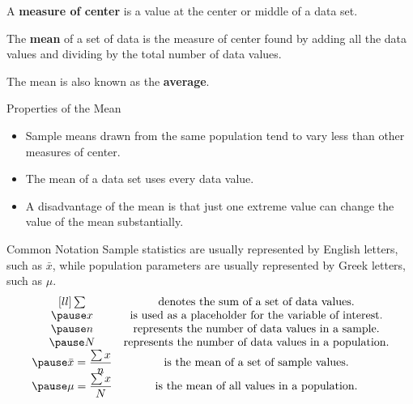 \documentclass{beamer}
\begin{document}
\begin{frame}
\begin{definition}
A \textbf{measure of center} is a value at the center or middle of a data set.
\end{definition}\pause

\begin{definition}
The \textbf{mean} of a set of data is the measure of center found by adding all the data values and dividing by the total number of data values.
\end{definition}\pause

\begin{note}
The mean is also known as the \textbf{average}.
\end{note}\pause

\begin{block}{Properties of the Mean}
\begin{itemize}
\item Sample means drawn from the same population tend to vary less than other measures of center.\pause
\item The mean of a data set uses every data value.\pause
\item A disadvantage of the mean is that just one extreme value can change the value of the mean substantially.
\end{itemize}
\end{block}
\end{frame}

\begin{frame}
\begin{block}{Common Notation}
Sample statistics are usually represented by English letters, such as $\bar{x}$, while population parameters are usually represented by Greek letters, such as $\mu$.\pause
\vspace{-4mm}
{\renewcommand*{\arraystretch}{2.2}
\begin{equation*}
\begin{matrix}[ll]
\sum & \text{denotes the sum of a set of data values.} \\\pause
x & \text{is used as a placeholder for the variable of interest.} \\\pause
n & \text{represents the number of data values in a sample.} \\\pause
N & \text{represents the number of data values in a population.} \\\pause
\bar{x}=\dfrac{\sum x}{n} & \text{is the mean of a set of sample values.} \\\pause
\mu = \dfrac{\sum x}{N} & \text{is the mean of all values in a population.}
\end{matrix}
\end{equation*}}
\end{block}
\end{frame}
\end{document}
